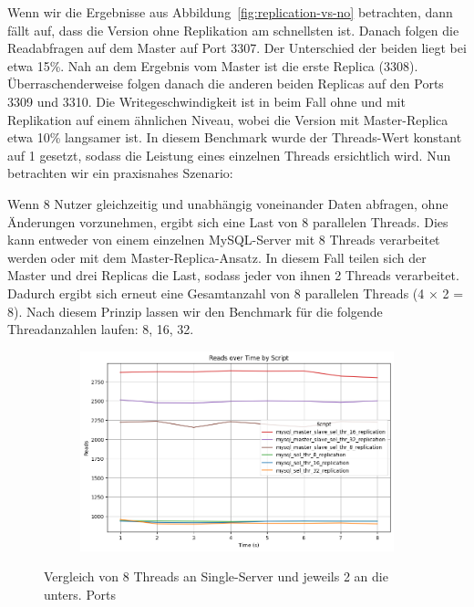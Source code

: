 Wenn wir die Ergebnisse aus Abbildung~\ref{fig:replication-vs-no} betrachten, dann fällt auf, dass die Version ohne Replikation am schnellsten ist.
Danach folgen die Readabfragen auf dem Master auf Port 3307.
Der Unterschied der beiden liegt bei etwa 15\%.
Nah an dem Ergebnis vom Master ist die erste Replica (3308).
Überraschenderweise folgen danach die anderen beiden Replicas auf den Ports 3309 und 3310.
Die Writegeschwindigkeit ist in beim Fall ohne und mit Replikation auf einem ähnlichen Niveau, wobei die Version mit Master-Replica etwa 10\% langsamer ist.
In diesem Benchmark wurde der Threads-Wert konstant auf 1 gesetzt, sodass die Leistung eines einzelnen Threads ersichtlich wird.
Nun betrachten wir ein praxisnahes Szenario:

Wenn 8 Nutzer gleichzeitig und unabhängig voneinander Daten abfragen, ohne Änderungen vorzunehmen, ergibt sich eine Last von 8 parallelen Threads.
Dies kann entweder von einem einzelnen MySQL-Server mit 8 Threads verarbeitet werden oder mit dem Master-Replica-Ansatz.
In diesem Fall teilen sich der Master und drei Replicas die Last, sodass jeder von ihnen 2 Threads verarbeitet.
Dadurch ergibt sich erneut eine Gesamtanzahl von 8 parallelen Threads (4 × 2 = 8).
Nach diesem Prinzip lassen wir den Benchmark für die folgende Threadanzahlen laufen: 8, 16, 32.

\vspace{-8pt}
\begin{figure}[H]
  \centering
  \begin{subfigure}[t]{0.48\textwidth}
    \includegraphics[width=\textwidth]{PNGs/Script/Replication/replication-multiple-select-threads/Reads}
    \label{replication-multiple-select-threads-reads}
  \end{subfigure}
  \vspace{-20pt}
  \caption[Replikation: Threadanzahl aufgeteilt an Master-Replica]{Vergleich von 8 Threads an Single-Server und jeweils 2 an die unters. Ports }
  \label{fig:replication-multiple-select-threads}
\end{figure}
\vspace{-20pt}


